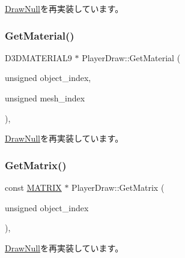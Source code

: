 \mbox{\hyperlink{class_draw_null_a8496ed1b1f765a331a8f1704122b8ca4}{Draw\+Null}}を再実装しています。

\mbox{\label{class_player_draw_ae818d3adaf5120845c2a78c230b5365e}} 
\subsubsection{\texorpdfstring{Get\+Material()}{GetMaterial()}}
{\footnotesize\ttfamily D3\+D\+M\+A\+T\+E\+R\+I\+A\+L9 $\ast$ Player\+Draw\+::\+Get\+Material (\begin{DoxyParamCaption}\item[{unsigned}]{object\+\_\+index,  }\item[{unsigned}]{mesh\+\_\+index }\end{DoxyParamCaption})\hspace{0.3cm}{\ttfamily [override]}, {\ttfamily [virtual]}}



\mbox{\hyperlink{class_draw_null_a84969d22d3436986f214e9896fe44fc6}{Draw\+Null}}を再実装しています。

\mbox{\label{class_player_draw_a8edf1441ea23f298c6a0ca707f54021a}} 
\subsubsection{\texorpdfstring{Get\+Matrix()}{GetMatrix()}}
{\footnotesize\ttfamily const \mbox{\hyperlink{_vector3_d_8h_a032295cd9fb1b711757c90667278e744}{M\+A\+T\+R\+IX}} $\ast$ Player\+Draw\+::\+Get\+Matrix (\begin{DoxyParamCaption}\item[{unsigned}]{object\+\_\+index }\end{DoxyParamCaption})\hspace{0.3cm}{\ttfamily [override]}, {\ttfamily [virtual]}}



\mbox{\hyperlink{class_draw_null_adede079e9c11a756090740b20bb43022}{Draw\+Null}}を再実装しています。

\mbox{\label{class_player_draw_ad9e2e09a32c7474fcea5e7e24e22bc71}} 
